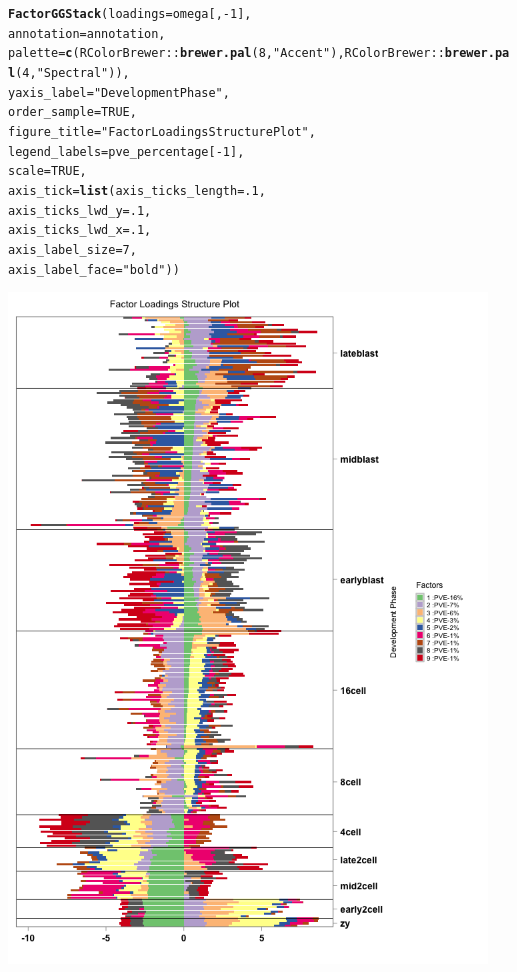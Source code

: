 \documentclass[12pt]{article}\usepackage[]{graphicx}\usepackage[usenames,dvipsnames]{color}
\makeatletter
\newcommand{\hlnum}[1]{\textcolor[rgb]{0.686,0.059,0.569}{#1}}%
\newcommand{\hlstr}[1]{\textcolor[rgb]{0.192,0.494,0.8}{#1}}%
\newcommand{\hlopt}[1]{\textcolor[rgb]{0,0,0}{#1}}%
\newcommand{\hlstd}[1]{\textcolor[rgb]{0.345,0.345,0.345}{#1}}%
\newcommand{\hlkwc}[1]{\textcolor[rgb]{0.333,0.667,0.333}{#1}}%
\newcommand{\hlkwd}[1]{\textcolor[rgb]{0.737,0.353,0.396}{\textbf{#1}}}%
\newenvironment{kframe}{%
 \def\at@end@of@kframe{}%
 \ifinner\ifhmode%
  \def\at@end@of@kframe{\end{minipage}}%
  \begin{minipage}{\columnwidth}%
 \fi\fi%
 \def\FrameCommand##1{\hskip\@totalleftmargin \hskip-\fboxsep
 \colorbox{shadecolor}{##1}\hskip-\fboxsep
     \hskip-\linewidth \hskip-\@totalleftmargin \hskip\columnwidth}%
 \MakeFramed {\advance\hsize-\width
   \@totalleftmargin\z@ \linewidth\hsize
   \@setminipage}}%
 {\par\unskip\endMakeFramed%
 \at@end@of@kframe}
\newenvironment{knitrout}{}{} %
\makeatother
\begin{document}
\begin{knitrout}
\begin{kframe}
\begin{alltt}
\hlkwd{FactorGGStack}\hlstd{(}\hlkwc{loadings} \hlstd{= omega[,}\hlopt{-}\hlnum{1}\hlstd{],}
                \hlkwc{annotation} \hlstd{= annotation,}
                \hlkwc{palette} \hlstd{=} \hlkwd{c}\hlstd{(RColorBrewer}\hlopt{::}\hlkwd{brewer.pal}\hlstd{(}\hlnum{8}\hlstd{,} \hlstr{"Accent"}\hlstd{),RColorBrewer}\hlopt{::}\hlkwd{brewer.pal}\hlstd{(}\hlnum{4}\hlstd{,} \hlstr{"Spectral"}\hlstd{)),}
                \hlkwc{yaxis_label} \hlstd{=} \hlstr{"Development Phase"}\hlstd{,}
                \hlkwc{order_sample} \hlstd{=} \hlnum{TRUE}\hlstd{,}
                \hlkwc{figure_title} \hlstd{=} \hlstr{"Factor Loadings Structure Plot"}\hlstd{,}
                \hlkwc{legend_labels} \hlstd{= pve_percentage[}\hlopt{-}\hlnum{1}\hlstd{],}
                \hlkwc{scale}\hlstd{=}\hlnum{TRUE}\hlstd{,}
                \hlkwc{axis_tick} \hlstd{=} \hlkwd{list}\hlstd{(}\hlkwc{axis_ticks_length} \hlstd{=} \hlnum{.1}\hlstd{,}
                                 \hlkwc{axis_ticks_lwd_y} \hlstd{=} \hlnum{.1}\hlstd{,}
                                 \hlkwc{axis_ticks_lwd_x} \hlstd{=} \hlnum{.1}\hlstd{,}
                                 \hlkwc{axis_label_size} \hlstd{=} \hlnum{7}\hlstd{,}
                                 \hlkwc{axis_label_face} \hlstd{=} \hlstr{"bold"}\hlstd{))}
\end{alltt}
\end{kframe}
\includegraphics[width=5in,height=7in]{figure/flash_structure-1} 

\end{knitrout}
\end{document}
